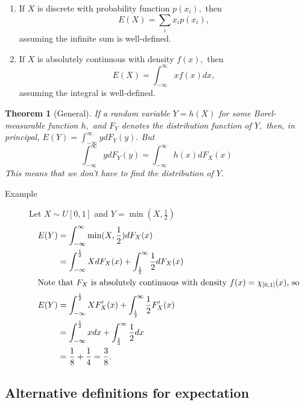 \documentclass[12pt]{report} \addtolength{\textheight}{2in}
\newtheorem{thm}{Theorem}
\newcommand{\totalint}{\int_{-\infty}^{\infty}}
\begin{document}
\begin{enumerate}
\item If $X$ is discrete with probability function $p(x_i),$ then
\begin{displaymath}
E(X)=\sum_i x_ip(x_i),
\end{displaymath}
assuming the infinite sum is well-defined.
\item If $X$ is absolutely continuous with density $f(x),$ then
\begin{displaymath}
E(X) =\totalint xf(x) dx,
\end{displaymath}
assuming the integral is well-defined.
\end{enumerate}
\begin{thm}[General]
If a random variable $Y=h(X)$ for some Borel-measurable function $h,$ and $F_Y$ denotes the distribution function of $Y,$ then, in principal, $E(Y)=\totalint y dF_Y(y).$ But
\begin{displaymath}
\totalint ydF_Y(y)=\totalint h(x)dF_X(x)
\end{displaymath}
This means that we don't have to find the distribution of $Y.$
\end{thm}
\begin{description}
\item[Example] Let $X\sim U[0,1]$ and $Y=\min (X, \frac{1}{2})$
\begin{align*}
E(Y)&=\totalint \min(X,\frac{1}{2})dF_X(x)\\
&=\int_{-\infty} ^{\frac{1}{2}} XdF_X(x)+\int_{\frac{1}{2}}^{\infty} \frac{1}{2} dF_X(x)\\
\intertext{Note that $F_X$ is absolutely continuous with density $f(x)=\chi_{[0,1]} (x)$, so}
E(Y)&=\int_{-\infty} ^{\frac{1}{2}} XF'_X(x)+\int_{\frac{1}{2}}^{\infty} \frac{1}{2}F'_X(x)\\
&=\int_{-\infty} ^{\frac{1}{2}} xdx+\int_{\frac{1}{2}}^{\infty} \frac{1}{2}dx\\
&=\frac{1}{8}+\frac{1}{4} =\frac{3}{8}.
\end{align*}
\end{description}
\subsection*{Alternative definitions for expectation}
\end{document}
